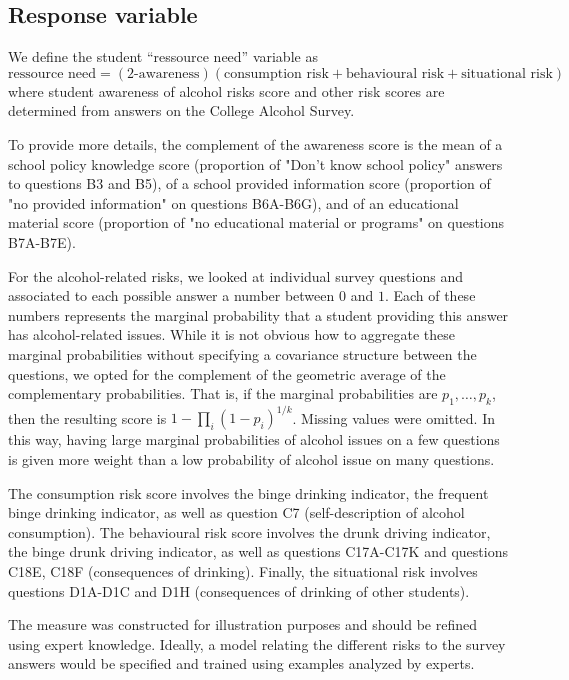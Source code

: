\documentclass[10pt]{amsart}%
\begin{document}
\subsection{Response variable}

We define the student ``ressource need'' variable as
$$
  \text{ressource need} = (\text{2-awareness}) (\text{consumption risk} + \text{behavioural risk} + \text{situational risk})
$$
where student awareness of alcohol risks score and other risk scores are determined from answers on the College Alcohol Survey.

To provide more details, the complement of the awareness score is the mean of a school policy knowledge score (proportion of "Don't know school policy" answers to questions B3 and B5), of a school provided information score (proportion of "no provided information" on questions B6A-B6G), and of an educational material score (proportion of "no educational material or programs" on questions B7A-B7E).

For the alcohol-related risks, we looked at individual survey questions and associated to each possible answer a number between $0$ and $1$. Each of these numbers represents the marginal probability that a student providing this answer has alcohol-related issues. While it is not obvious how to aggregate these marginal probabilities without specifying a covariance structure between the questions, we opted for the complement of the geometric average of the complementary probabilities. That is, if the marginal probabilities are $p_1, \dots, p_k$, then the resulting score is $1-\prod_i (1-p_i)^{1/k}$. Missing values were omitted. In this way, having large marginal probabilities of alcohol issues on a few questions is given more weight than a low probability of alcohol issue on many questions. 

The consumption risk score involves the binge drinking indicator, the frequent binge drinking indicator, as well as question C7 (self-description of alcohol consumption). The behavioural risk score involves the drunk driving indicator, the binge drunk driving indicator, as well as questions C17A-C17K and questions C18E, C18F (consequences of drinking). Finally, the situational risk involves questions D1A-D1C and D1H (consequences of drinking of other students).

The measure was constructed for illustration purposes and should be refined using expert knowledge. Ideally, a model relating the different risks to the survey answers would be specified and trained using examples analyzed by experts. 
\end{document}
